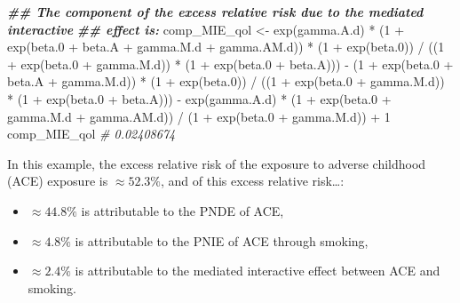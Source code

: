 \documentclass[
]{book}
\newenvironment{Shaded}{\begin{snugshade}}{\end{snugshade}}
\newcommand{\CommentTok}[1]{\textcolor[rgb]{0.56,0.35,0.01}{\textit{#1}}}
\newcommand{\DecValTok}[1]{\textcolor[rgb]{0.00,0.00,0.81}{#1}}
\newcommand{\DocumentationTok}[1]{\textcolor[rgb]{0.56,0.35,0.01}{\textbf{\textit{#1}}}}
\newcommand{\FloatTok}[1]{\textcolor[rgb]{0.00,0.00,0.81}{#1}}
\newcommand{\FunctionTok}[1]{\textcolor[rgb]{0.00,0.00,0.00}{#1}}
\newcommand{\NormalTok}[1]{#1}
\newcommand{\OtherTok}[1]{\textcolor[rgb]{0.56,0.35,0.01}{#1}}
\newcommand{\SpecialCharTok}[1]{\textcolor[rgb]{0.00,0.00,0.00}{#1}}
\providecommand{\tightlist}{%
  \setlength{\itemsep}{0pt}\setlength{\parskip}{0pt}}
\begin{document}
\begin{Shaded}
\begin{Highlighting}[]
\DocumentationTok{\#\# The component of the excess relative risk due to the mediated interactive}
\DocumentationTok{\#\# effect is:}
\NormalTok{comp\_MIE\_qol }\OtherTok{\textless{}{-}} \FunctionTok{exp}\NormalTok{(gamma.A.d) }\SpecialCharTok{*}
\NormalTok{  (}\DecValTok{1} \SpecialCharTok{+} \FunctionTok{exp}\NormalTok{(beta}\FloatTok{.0} \SpecialCharTok{+}\NormalTok{ beta.A }\SpecialCharTok{+}\NormalTok{ gamma.M.d }\SpecialCharTok{+}\NormalTok{ gamma.AM.d)) }\SpecialCharTok{*}\NormalTok{ (}\DecValTok{1} \SpecialCharTok{+} \FunctionTok{exp}\NormalTok{(beta}\FloatTok{.0}\NormalTok{)) }\SpecialCharTok{/}
\NormalTok{  ((}\DecValTok{1} \SpecialCharTok{+} \FunctionTok{exp}\NormalTok{(beta}\FloatTok{.0} \SpecialCharTok{+}\NormalTok{ gamma.M.d)) }\SpecialCharTok{*}\NormalTok{ (}\DecValTok{1} \SpecialCharTok{+} \FunctionTok{exp}\NormalTok{(beta}\FloatTok{.0} \SpecialCharTok{+}\NormalTok{ beta.A))) }\SpecialCharTok{{-}}
\NormalTok{  (}\DecValTok{1} \SpecialCharTok{+} \FunctionTok{exp}\NormalTok{(beta}\FloatTok{.0} \SpecialCharTok{+}\NormalTok{ beta.A }\SpecialCharTok{+}\NormalTok{ gamma.M.d)) }\SpecialCharTok{*}\NormalTok{ (}\DecValTok{1} \SpecialCharTok{+} \FunctionTok{exp}\NormalTok{(beta}\FloatTok{.0}\NormalTok{)) }\SpecialCharTok{/}
\NormalTok{  ((}\DecValTok{1} \SpecialCharTok{+} \FunctionTok{exp}\NormalTok{(beta}\FloatTok{.0} \SpecialCharTok{+}\NormalTok{ gamma.M.d)) }\SpecialCharTok{*}\NormalTok{ (}\DecValTok{1} \SpecialCharTok{+} \FunctionTok{exp}\NormalTok{(beta}\FloatTok{.0} \SpecialCharTok{+}\NormalTok{ beta.A))) }\SpecialCharTok{{-}}
  \FunctionTok{exp}\NormalTok{(gamma.A.d) }\SpecialCharTok{*}\NormalTok{ (}\DecValTok{1} \SpecialCharTok{+} \FunctionTok{exp}\NormalTok{(beta}\FloatTok{.0} \SpecialCharTok{+}\NormalTok{ gamma.M.d }\SpecialCharTok{+}\NormalTok{ gamma.AM.d)) }\SpecialCharTok{/}
\NormalTok{  (}\DecValTok{1} \SpecialCharTok{+} \FunctionTok{exp}\NormalTok{(beta}\FloatTok{.0} \SpecialCharTok{+}\NormalTok{ gamma.M.d)) }\SpecialCharTok{+} \DecValTok{1}
\NormalTok{comp\_MIE\_qol}
\CommentTok{\# 0.02408674}
\end{Highlighting}
\end{Shaded}

In this example, the excess relative risk of the exposure to adverse childhood (ACE) exposure is \(\approx 52.3\%\), and of this excess relative risk\ldots:

\begin{itemize}
\tightlist
\item
  \(\approx 44.8\%\) is attributable to the PNDE of ACE,
\item
  \(\approx 4.8\%\) is attributable to the PNIE of ACE through smoking,
\item
  \(\approx 2.4\%\) is attributable to the mediated interactive effect between ACE and smoking.
\end{itemize}
\end{document}
